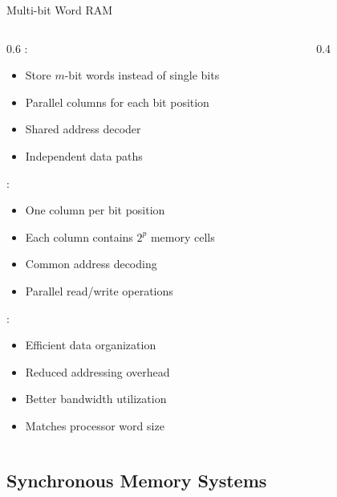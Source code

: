\begin{frame}{Multi-bit Word RAM}
\begin{columns}
\begin{column}{0.6\textwidth}
:
\begin{itemize}
\item Store $m$-bit words instead of single bits
\item Parallel columns for each bit position
\item Shared address decoder
\item Independent data paths
\end{itemize}
\vspace{0.3cm}
:
\begin{itemize}
\item One column per bit position
\item Each column contains $2^p$ memory cells
\item Common address decoding
\item Parallel read/write operations
\end{itemize}
\vspace{0.3cm}
:
\begin{itemize}
\item Efficient data organization
\item Reduced addressing overhead
\item Better bandwidth utilization
\item Matches processor word size
\end{itemize}
\end{column}
\begin{column}{0.4\textwidth}
\begin{center}

\end{center}
\end{column}
\end{columns}
\end{frame}

\subsection{Synchronous Memory Systems}

